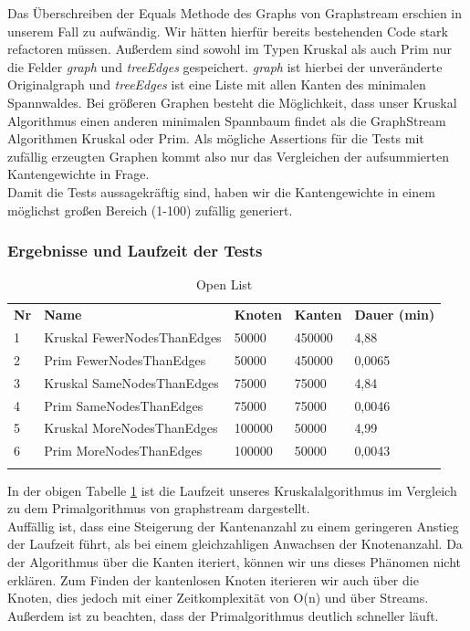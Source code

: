 \documentclass[a4paper]{article}
\begin{document}
Das Überschreiben der Equals Methode des Graphs von Graphstream erschien in unserem Fall zu aufwändig. Wir hätten hierfür bereits bestehenden Code stark refactoren müssen. Außerdem sind sowohl im Typen Kruskal als auch Prim nur die Felder \textit{graph} und \textit{treeEdges} gespeichert. \textit{graph} ist hierbei der unveränderte Originalgraph und \textit{treeEdges} ist eine Liste mit allen Kanten des minimalen Spannwaldes. Bei größeren Graphen besteht die Möglichkeit, dass unser Kruskal Algorithmus einen anderen minimalen Spannbaum findet als die GraphStream Algorithmen Kruskal oder Prim. Als mögliche Assertions für die Tests mit zufällig erzeugten Graphen kommt also nur das Vergleichen der aufsummierten Kantengewichte in Frage.\\
Damit die Tests aussagekräftig sind, haben wir die Kantengewichte in einem möglichst großen Bereich (1-100) zufällig generiert.

\subsubsection{Ergebnisse und Laufzeit der Tests}

\begin{table}[htbp]
    \centering
    \begin{tabular}{||l|l|l|l|l||}
    \hhline{|t:=====:t|}
    \textbf{Nr} & \textbf{Name} & \textbf{Knoten} & \textbf{Kanten} & \textbf{Dauer (min)} \\ \hhline{|-----|}
         1 & Kruskal FewerNodesThanEdges & 50000 & 450000 & 4,88 \\ \hhline{|-----|}
         2 & Prim FewerNodesThanEdges & 50000 & 450000 & 0,0065 \\ \hhline{|-----|}
         3 & Kruskal SameNodesThanEdges & 75000 & 75000 & 4,84 \\ \hhline{|-----|}
         4 & Prim SameNodesThanEdges & 75000 & 75000 & 0,0046 \\ \hhline{|-----|}
         5 & Kruskal MoreNodesThanEdges & 100000 & 50000 & 4,99 \\ \hhline{|-----|}
         6 & Prim MoreNodesThanEdges & 100000 & 50000 & 0,0043 \\ \hhline{|b:=====:b|}
    \end{tabular}
    \caption{Open List}
    \label{laufzeit}
\end{table}

In der obigen Tabelle \ref{laufzeit} ist die Laufzeit unseres Kruskalalgorithmus im Vergleich zu dem Primalgorithmus von graphstream dargestellt.\\
Auffällig ist, dass eine Steigerung der Kantenanzahl zu einem geringeren Anstieg der Laufzeit führt, als bei einem gleichzahligen Anwachsen der Knotenanzahl. 
Da der Algorithmus über die Kanten iteriert, können wir uns dieses Phänomen nicht erklären. Zum Finden der kantenlosen Knoten iterieren wir auch über die Knoten, dies jedoch mit einer Zeitkomplexität von O(n) und über Streams.
Außerdem ist zu beachten, dass der Primalgorithmus deutlich schneller läuft.



\end{document}
